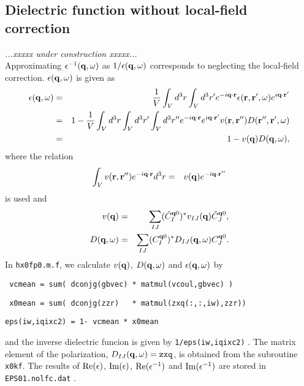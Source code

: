 \documentclass[a4paper,10pt,epsf,fleqn]{article}
\def\underconstruction{{\it...xxxxx under construction xxxxx...\\}}
\begin{document}
\subsection{Dielectric function without local-field correction}
\underconstruction
Approximating $\epsilon^{-1}({\bf q},\omega)$ as $1/\epsilon({\bf q},\omega)$
corresponds to neglecting the local-field correction.
$\epsilon({\bf q},\omega)$ is given as 
\begin{eqnarray}
  \epsilon({\bf q},\omega) 
 &=& \frac{1}{V}
  \int_V d^3r \int_V d^3r' e^{-i{\bf q}\cdot{\bf r}}
  \epsilon({\bf r},{\bf r}',\omega)e^{i{\bf q}\cdot{\bf r}'} \nonumber \\
 &=& 1 - \frac{1}{V} \int_V d^3r \int_V d^3r' \int_V d^3r''
  e^{-i{\bf q}\cdot{\bf r}} e^{i{\bf q}\cdot{\bf r}'} 
  v({\bf r,r''})D({\bf r'',r'},\omega)  \nonumber \\
 &=& 1 - v({\bf q})D({\bf q},\omega),
           \label{eq. eps1}
\end{eqnarray}
where the relation
\begin{eqnarray}
   \int_V v({\bf r},{\bf r}'')e^{-i{\bf q}\cdot{\bf r}}d^3r 
  &=& v({\bf q})e^{-i{\bf q \cdot r''}}
\end{eqnarray}
is used and 
\begin{eqnarray}
   v({\bf q}) &=& \sum_{IJ}( \tilde{C}^{{\bf q}0}_I )^*
                v_{IJ}({\bf q})\tilde{C}^{{\bf q}0}_J , \\
   D({\bf q},\omega) 
              &=& \sum_{IJ}( C^{{\bf q}0}_I )^*
                D_{IJ}({\bf q},\omega) C^{{\bf q}0}_J.     
\end{eqnarray}
In \verb|hx0fp0.m.f|, we calculate $v({\bf q})$, $D({\bf q},\omega)$ 
and $\epsilon({\bf q},\omega)$ by
\begin{center}
    \verb| vcmean = sum( dconjg(gbvec) * matmul(vcoul,gbvec) )   |
    
    \verb| x0mean = sum( dconjg(zzr)   * matmul(zxq(:,:,iw),zzr))|
    
    \verb|eps(iw,iqixc2) = 1- vcmean * x0mean|
\end{center}
and the inverse dielectric funcion is given by
\verb|1/eps(iw,iqixc2)| .  
The matrix element of the polarization, $D_{IJ}({\bf q},\omega)=\verb|zxq|$,
is obtained from the subroutine \verb|x0kf|.
The results of ${\rm Re}(\epsilon)$, ${\rm Im}(\epsilon)$, 
${\rm Re}(\epsilon^{-1})$
and ${\rm Im}(\epsilon^{-1})$ are stored in \verb|EPS01.nolfc.dat| .
\end{document}
